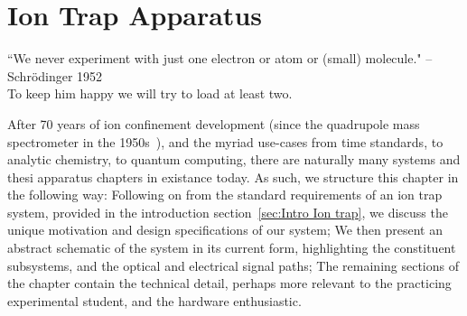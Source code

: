 \chapter{Ion Trap Apparatus}
``We never experiment with just one electron or atom or (small) molecule." -- Schr\"odinger 1952\\
To keep him happy we will try to load at least two.

\minitoc

    After 70 years of ion confinement development (since the quadrupole mass
    spectrometer in the 1950s~\cite{paul_electromagnetic_1990}), and the myriad
    use-cases from time standards, to analytic chemistry, to quantum computing,
    there are naturally many systems and thesi apparatus chapters in existance
    today. As such, we structure this chapter in the following way: 
    Following on from the standard requirements of an ion trap system, provided in the introduction section~\ref{sec:Intro Ion trap},
    we discuss the unique motivation and design specifications of our system; 
    We then present an abstract schematic of the system in
    its current form, highlighting the constituent subsystems, and the optical
    and electrical signal paths; 
    The remaining sections of the chapter contain
    the technical detail, perhaps more relevant to the practicing experimental
    student, and the hardware enthusiastic.\\

